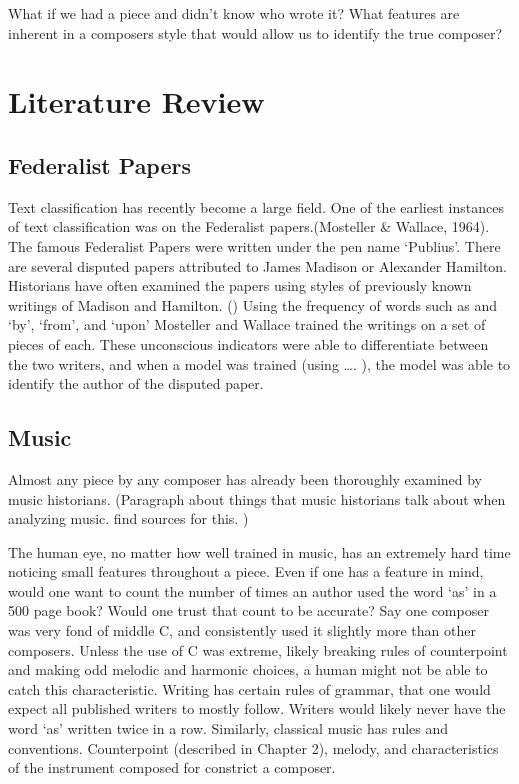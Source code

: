 \documentclass[12pt,twoside]{reedthesis}
\theoremstyle{definition}
\theoremstyle{definition}
\theoremstyle{definition}
\theoremstyle{remark}
\begin{document}
What if we had a piece and didn't know who wrote it? What features are
inherent in a composers style that would allow us to identify the true
composer?

\section{Literature Review}\label{literature-review}

\subsection{Federalist Papers}\label{federalist-papers}

Text classification has recently become a large field. One of the
earliest instances of text classification was on the Federalist
papers.(Mosteller \& Wallace, 1964). The famous Federalist Papers were
written under the pen name `Publius'. There are several disputed papers
attributed to James Madison or Alexander Hamilton. Historians have often
examined the papers using styles of previously known writings of Madison
and Hamilton. () Using the frequency of words such as and `by', `from',
and `upon' Mosteller and Wallace trained the writings on a set of pieces
of each. These unconscious indicators were able to differentiate between
the two writers, and when a model was trained (using \ldots{}. ), the
model was able to identify the author of the disputed paper.

\subsection{Music}\label{music}

Almost any piece by any composer has already been thoroughly examined by
music historians. (Paragraph about things that music historians talk
about when analyzing music. find sources for this. )

The human eye, no matter how well trained in music, has an extremely
hard time noticing small features throughout a piece. Even if one has a
feature in mind, would one want to count the number of times an author
used the word `as' in a 500 page book? Would one trust that count to be
accurate? Say one composer was very fond of middle C, and consistently
used it slightly more than other composers. Unless the use of C was
extreme, likely breaking rules of counterpoint and making odd melodic
and harmonic choices, a human might not be able to catch this
characteristic. Writing has certain rules of grammar, that one would
expect all published writers to mostly follow. Writers would likely
never have the word `as' written twice in a row. Similarly, classical
music has rules and conventions. Counterpoint (described in Chapter 2),
melody, and characteristics of the instrument composed for constrict a
composer.
\end{document}
